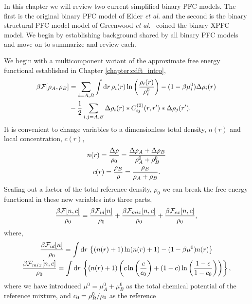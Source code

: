 \label{chapter:binary}

In this chapter we will review two current simplified binary PFC models.  The
first is the original binary PFC model of Elder \textit{et al.} \cite{ELDER07}
and the second is the binary structural PFC model  model of Greenwood
\textit{et al.} \cite{GREENWOOD11_BINARY} --coined the binary XPFC model. We
begin by establishing background shared by  all binary PFC models and move on
to summarize and review each.

We begin with a multicomponent variant of the approximate free energy
functional established in Chapter \ref{chapter:cdft_intro},
%
\begin{align}
    \label{binary_cdft_free_energy}
    \beta\mathcal{F}[\rho_A, \rho_B] &= \sum_{i=A, B} \int \mathrm{d}r 
        \,\rho_i(r) \ln\left(\frac{\rho_i(r)}{\rho_i^0}\right) 
        - (1 - \beta\mu_i^0)\Delta\rho_i(r)\\
    &- \frac{1}{2} \sum_{i,j=A, B} \Delta\rho_i(r) \ast C^{(2)}_{ij}(r, r^\prime) 
        \ast \Delta\rho_j(r^\prime). \nonumber
\end{align}
%
It is convenient to change variables to a dimensionless total density, $n(r)$
and local concentration, $c(r)$,
%
\begin{gather}
    n(r) = \frac{\Delta \rho}{\rho_0} = \frac{\Delta\rho_A + \Delta\rho_B}{\rho_A^0 + \rho_B^0} \\
    c(r) = \frac{\rho_B}{\rho} = \frac{\rho_B}{\rho_A + \rho_B}.
\end{gather}
%
Scaling out a factor of the total reference density, $\rho_0$ we can break the
free energy functional in these new variables into three parts,
%
\begin{equation}
    \label{binary_total_free_energy}
    \frac{\beta\mathcal{F}[n, c]}{\rho_0} = \frac{\beta\mathcal{F}_{id}[n]}{\rho_0} 
        + \frac{\beta\mathcal{F}_{mix}[n, c]}{\rho_0}
        + \frac{\beta\mathcal{F}_{ex}[n, c]}{\rho_0},
\end{equation}
%
where,
%
\begin{gather}
    \label{binary_ideal}
    \frac{\beta\mathcal{F}_{id}[n]}{\rho_0} =
        \int \mathrm{d}r \,\left\lbrace (n(r) + 1)\ln(n(r) + 1) 
        - (1 - \beta\mu^0)n(r) \right\rbrace \\
    \label{binary_mixing}
    \frac{\beta\mathcal{F}_{mix}[n, c]}{\rho_0} =
        \int \mathrm{d}r \,\left\lbrace (n(r) + 1)\left( 
            c\ln\left(\frac{c}{c_0}\right) + (1-c)\ln\left(\frac{1-c}{1-c_0}\right) \right)\right\rbrace, 
\end{gather}
%
where we have introduced $\mu^0=\mu_A^0+\mu_B^0$ as the total chemical
potential of the reference mixture, and $c_0 = \rho_B^0 / \rho_0$ as the reference
